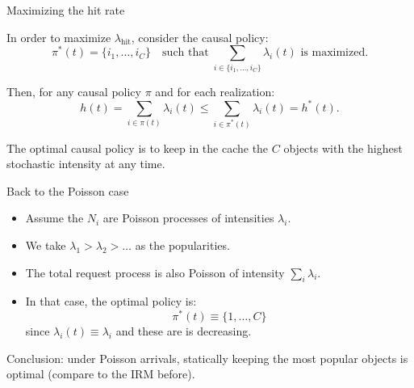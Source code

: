 \documentclass[aspectratio=169]{beamer}
\newenvironment*{myitem}[1][1.5em]{\begin{itemize}\setlength{\itemsep}{#1}}{\end{itemize}}
\begin{document}
\begin{frame}{Maximizing the hit rate}
	
	In order to maximize $\lambda_{\text{hit}}$, consider the causal policy:
	\begin{equation*}
		\pi^*(t) = \{i_1,\ldots,i_C\} \quad \text{such that}\; \sum_{i\in\{i_1,\ldots,i_C\}} \lambda_{i}(t) \text{ is maximized.}
	\end{equation*}

	Then, for any causal policy $\pi$ and for each realization:
	\begin{equation*}
		h(t) = \sum_{i\in\pi(t)} \lambda_i(t) \leqslant \sum_{i\in \pi^*(t)} \lambda_i(t) = h^*(t).
	\end{equation*} 

	\begin{theorem}
		The \alert{optimal causal policy} is to keep in the cache the $C$ objects with the \alert{highest stochastic intensity} at any time.
	\end{theorem}

\end{frame}

\begin{frame}{Back to the Poisson case}

	\begin{myitem}
		\item Assume the $N_i$ are Poisson processes of intensities $\lambda_i$.
		\item We take $\lambda_1>\lambda_2>\ldots$ as the popularities.
		\item The total request process is also Poisson of intensity $\sum_i\lambda_i$.
		\item In that case, the optimal policy is:
		\begin{equation*}
			\pi^*(t) \equiv \{1,\ldots,C\}
		\end{equation*}
		since $\lambda_i(t)\equiv \lambda_i$ and these are is decreasing.
	\end{myitem}

	\pause \vfill
	\alert{Conclusion:} under Poisson arrivals, statically keeping the most popular objects is optimal (compare to the IRM before).
\end{frame}
\end{document}
